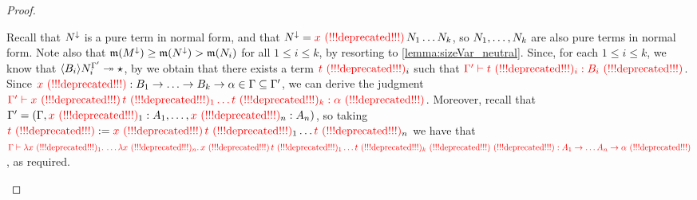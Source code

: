 \begin{proof}
\begin{enumerate}
  Recall that $\utmtwo^\downarrow$ is a pure term in normal form,
  and that $\utmtwo^\downarrow = \var\,\utmtwo_1\hdots\utmtwo_k$,
  so $\utmtwo_1,\hdots,\utmtwo_k$ are also pure terms in normal form.
  Note also that
  $\meas{\utm^\downarrow}
   \geq \meas{\utmtwo^\downarrow}
   > \meas{\utmtwo_i}$ for all $1 \leq i \leq k$,
  by resorting to \cref{lemma:sizeVar_neutral}.
  Since, for each $1 \leq i \leq k$,
  we know that $\verif{\typtwo_i}{\subs{\utmtwo_i}{\tenvtwo}} \tos \iunit$,
  by \ih we obtain that
  there exists a term $\tm_i$ such that
  $\judg{\tenvtwo}{\tm_i}{\typtwo_i}$.
  Since $\var:\typtwo_1\to\hdots\to\typtwo_k\to\btyp \in \tenv \subseteq \tenvtwo$,
  we can derive the judgment
  $\judg{\tenvtwo}{\var\,\tm_1\hdots\tm_k}{\btyp}$.
  Moreover, recall that $\tenvtwo = (\tenv,\var_1:\typ_1,\hdots,\var_n:\typ_n)$,
  so taking $\tm := \var\,\tm_1\hdots\tm_n$
  we have that
  $\judg{\tenv}{\lam{\var_1}{\hdots\lam{\var_n}{\var\,\tm_1\hdots\tm_k}}}{\typ_1\to\hdots\typ_n\to\btyp}$,
  as required.
\end{enumerate}
\end{proof}

